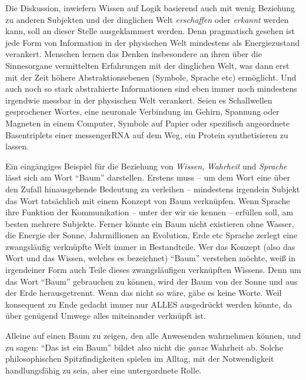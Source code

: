 Die Diskussion, inwiefern Wissen auf Logik basierend auch mit wenig Beziehung zu anderen Subjekten und der dinglichen Welt \emph{erschaffen} oder \emph{erkannt} werden kann, soll an dieser Stelle ausgeklammert werden. Denn pragmatisch gesehen ist jede Form von Information in der physischen Welt mindestens als Energiezustand verankert. Menschen lernen das Denken insbesondere an ihren über die Sinnesorgane vermittelten Erfahrungen mit der dinglichen Welt, was dann erst mit der Zeit höhere Abstraktionsebenen (Symbole, Sprache \gls{etc}) ermöglicht. Und auch noch so stark abstrahierte Informationen sind eben immer noch mindestens irgendwie messbar in der physischen Welt verankert. Seien es Schallwellen gesprochener Wortes, eine neuronale Verbindung im Gehirn, Spannung oder Magneten in einem Computer, Symbole auf Papier oder spezifisch angeordnete Basentriplets einer messengerRNA auf dem Weg, ein Protein synthetisieren zu lassen. 

Ein eingängiges Beispiel für die Beziehung von \emph{Wissen}, \emph{Wahrheit} und \emph{Sprache} lässt sich am Wort \enquote{Baum} darstellen. Erstens muss -- um dem Wort eine über den Zufall hinausgehende Bedeutung zu verleihen -- mindestens irgendein Subjekt das Wort tatsächlich mit einem Konzept von Baum verknüpfen. Wenn Sprache ihre Funktion der Kommunikation -- unter der wir sie kennen -- erfüllen soll, am besten mehrere Subjekte.
Ferner könnte ein Baum nicht existieren ohne Wasser, die Energie der Sonne, Jahrmillionen an Evolution, Erde \gls{etc} Sprache zerlegt eine zwangsläufig verknüpfte Welt immer in Bestandteile. 
Wer das Konzept (also das Wort und das Wissen, welches es bezeichnet) \enquote{Baum} verstehen möchte, weiß in irgendeiner Form auch Teile dieses zwangsläufigen verknüpften Wissens. Denn um das Wort \enquote{Baum} gebrauchen zu können, wird der Baum von der Sonne und aus der Erde herausgetrennt. Wenn das nicht so wäre, gäbe es keine Worte. Weil konsequent zu Ende gedacht immer nur ALLES ausgedrückt werden könnte, da über genügend Umwege alles miteinander verknüpft ist.

Alleine auf einen Baum zu zeigen, den alle Anwesenden wahrnehmen können, und zu sagen: \enquote{Das ist ein Baum} bildet also nicht die \emph{ganze} Wahrheit ab. Solche philosophischen Spitzfindigkeiten spielen im Alltag, mit der Notwendigkeit handlungsfähig zu sein, aber eine untergordnete Rolle. %

